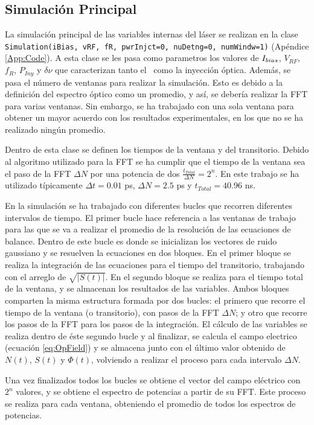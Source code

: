 	\subsection{Simulaci\'on Principal}
		\label{Mdl:Code:main}
		
		La simulaci\'on principal de las variables internas del l\'aser se realizan en la clase \texttt{Simulation(iBias, vRF, fR, pwrInjct=0, nuDetng=0, numWindw=1)} (Ap\'endice \ref{App:Code}). A esta clase se les pasa como parametros los valores de $I_{bias}$, $V_{RF}$, $f_R$, $P_{Iny}$ y $\delta\nu$ que caracterizan tanto el \gs\ como la inyección \'optica. Adem\'as, se pasa el n\'umero de ventanas para realizar la simulaci\'on. Esto es debido a la definici\'on del espectro \'optico como un promedio, y as\'i, se deber\'ia realizar la FFT para varias ventanas. Sin embargo, se ha trabajado con una sola ventana para obtener un mayor acuerdo con los resultados experimentales, en los que no se ha realizado ning\'un promedio.

		Dentro de esta clase se definen los tiempos de la ventana y del transitorio. Debido al algoritmo utilizado para la FFT se ha cumplir que el tiempo de la ventana sea el paso de la FFT $\Delta N$ por una potencia de dos $\frac{t_{Total}}{\Delta N} = 2^n$. En este trabajo se ha utilizado típicamente $\Delta t = 0.01$ ps, $\Delta N = 2.5$ ps y $t_{Total} = 40.96$ ns.

		En la simulaci\'on se ha trabajado con diferentes bucles que recorren diferentes intervalos de tiempo. El primer bucle hace referencia a las ventanas de trabajo para las que se va a realizar el promedio de la resoluci\'on de las ecuaciones de balance. Dentro de este bucle es donde se inicializan los vectores de ruido gaussiano y se resuelven la ecuaciones en dos bloques. En el primer bloque se realiza la integraci\'on de las ecuaciones para el tiempo del transitorio, trabajando con el arreglo de $\sqrt{|S(t)|}$. En el segundo bloque se realiza para el tiempo total de la ventana, y se almacenan los resultados de las variables. Ambos bloques comparten la misma estructura formada por dos bucles: el primero que recorre el tiempo de la ventana (o transitorio), con pasos de la FFT $\Delta N$; y otro que recorre los pasos de la FFT para los pasos de la integraci\'on. El c\'alculo de las variables se realiza dentro de \'este segundo bucle y al finalizar, se calcula el campo electrico (ecuaci\'on \ref{eq:OpField}) y se almacena junto con el \'ultimo valor obtenido de $N(t)$, $S(t)$ y $\Phi(t)$, volviendo a realizar el proceso para cada intervalo $\Delta N$. 

		Una vez finalizados todos los bucles se obtiene el vector del campo el\'ectrico con $2^n$ valores, y se obtiene el espectro de potencias a partir de su FFT. Este proceso se realiza para cada ventana, obteniendo el promedio de todos los espectros de potencias.

